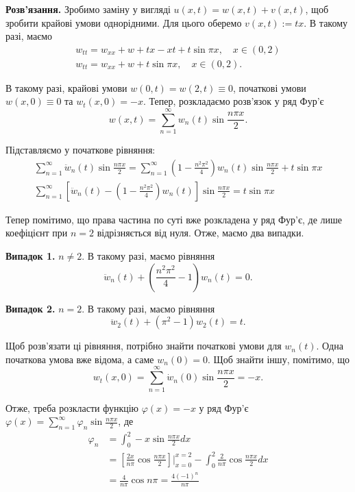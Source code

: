 \documentclass{exam_template}
\begin{document}
\textbf{Розв'язання.} Зробимо заміну у вигляді $u(x,t) = w(x,t) + v(x,t)$,
щоб зробити крайові умови однорідними. Для цього оберемо $v(x,t) := tx$.
В такому разі, маємо
\begin{gather*}
    w_{tt} = w_{xx} + w + tx - xt + t \sin \pi x, \quad x \in (0,2) \\
    w_{tt} = w_{xx} + w + t \sin \pi x, \quad x \in (0,2).
\end{gather*}

В такому разі, крайові умови $w(0,t) = w(2,t) \equiv 0$, початкові умови $w(x,0)
\equiv 0$ та $w_t(x,0) = -x$. Тепер, розкладаємо розв'язок у ряд Фур'є
\begin{equation*}
    w(x,t) = \sum_{n=1}^{\infty} w_n(t) \sin \frac{n \pi x}{2}.
\end{equation*}

Підставляємо у початкове рівняння:
\begin{gather*}
    \sum_{n=1}^{\infty} \ddot{w}_n(t) \sin \frac{n \pi x}{2} = \sum_{n=1}^{\infty} \left(1-\frac{n^2\pi^2}{4}\right) w_n(t)\sin \frac{n\pi x}{2} + t \sin \pi x \\
    \sum_{n=1}^{\infty} \left[\ddot{w}_n(t) - \left(1-\frac{n^2\pi^2}{4}\right) w_n(t)\right] \sin \frac{n \pi x}{2} = t \sin \pi x
\end{gather*}

Тепер помітимо, що права частина по суті вже розкладена у ряд Фур'є, де 
лише коефіцієнт при $n=2$ відрізняється від нуля. Отже, маємо два випадки.

\textbf{Випадок 1.} $n \neq 2$. В такому разі, маємо рівняння
\begin{equation*}
    \ddot{w}_n(t) + \left(\frac{n^2\pi^2}{4}-1\right) w_n(t) = 0.
\end{equation*}

\textbf{Випадок 2.} $n=2$. В такому разі, маємо рівняння
\begin{equation*}
    \ddot{w}_2(t) + \left(\pi^2 - 1\right) w_2(t) = t.
\end{equation*}

Щоб розв'язати ці рівняння, потрібно знайти початкові умови для $w_n(t)$.
Одна початкова умова вже відома, а саме $w_n(0) = 0$. Щоб знайти іншу,
помітимо, що
\begin{equation*}
    w_t(x,0) = \sum_{n=1}^{\infty} \dot{w}_n(0) \sin \frac{n \pi x}{2} = -x.
\end{equation*}

Отже, треба розкласти функцію $\varphi(x) = -x$ у ряд Фур'є $\varphi(x) = \sum_{n=1}^{\infty} \varphi_n \sin \frac{n \pi x}{2}$, де
\begin{align*}
    \varphi_n &= \int_0^2 -x \sin \frac{n \pi x}{2} dx \\
    &= \left[\frac{2x}{n \pi}\cos \frac{n\pi x}{2}\right]\Big|_{x=0}^{x=2} - \int_0^2 \frac{2}{n\pi}\cos \frac{n\pi x}{2}dx \\
    &= \frac{4}{n\pi}\cos n\pi = \frac{4(-1)^n}{n\pi}
\end{align*}
\end{document}
